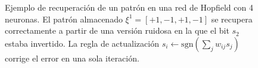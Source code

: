 \begin{figure}[H]
\caption{Ejemplo de recuperación de un patrón en una red de Hopfield con
4 neuronas. El patrón almacenado $\xi^1 = [+1,-1,+1,-1]$ se recupera
correctamente a partir de una versión ruidosa en la que el bit $s_2$ estaba
invertido. La regla de actualización $s_i \leftarrow \text{sgn}\!\left(\sum_j w_{ij} s_j\right)$
corrige el error en una sola iteración.}
\label{fig:hopfield_ejemplo}
\end{figure}
